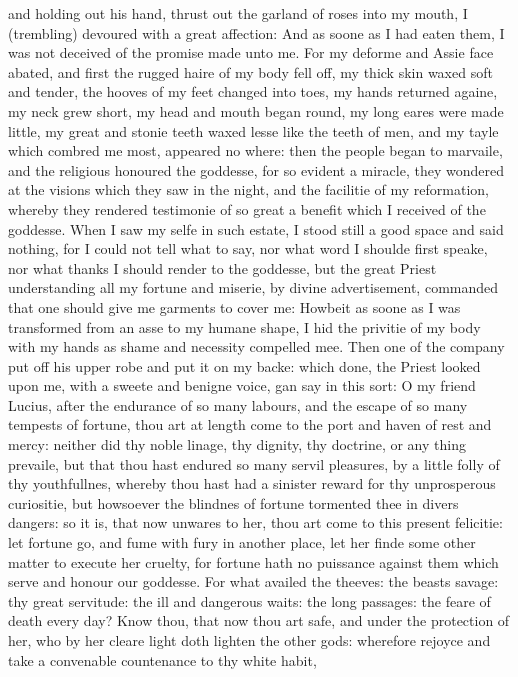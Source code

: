 and holding out his hand, thrust out the garland of roses into my mouth, I
(trembling) devoured with a great affection: And as soone as I had eaten them,
I was not deceived of the promise made unto me. For my deforme and Assie face
abated, and first the rugged haire of my body fell off, my thick skin waxed
soft and tender, the hooves of my feet changed into toes, my hands returned
againe, my neck grew short, my head and mouth began round, my long eares were
made little, my great and stonie teeth waxed lesse like the teeth of men, and
my tayle which combred me most, appeared no where: then the people began to
marvaile, and the religious honoured the goddesse, for so evident a miracle,
they wondered at the visions which they saw in the night, and the facilitie of
my reformation, whereby they rendered testimonie of so great a benefit which I
received of the goddesse. When I saw my selfe in such estate, I stood still a
good space and said nothing, for I could not tell what to say, nor what word I
shoulde first speake, nor what thanks I should render to the goddesse, but the
great Priest understanding all my fortune and miserie, by divine advertisement,
commanded that one should give me garments to cover me: Howbeit as soone as I
was transformed from an asse to my humane shape, I hid the privitie of my body
with my hands as shame and necessity compelled mee. Then one of the company put
off his upper robe and put it on my backe: which done, the Priest looked upon
me, with a sweete and benigne voice, gan say in this sort: O my friend Lucius,
after the endurance of so many labours, and the escape of so many tempests of
fortune, thou art at length come to the port and haven of rest and mercy:
neither did thy noble linage, thy dignity, thy doctrine, or any thing prevaile,
but that thou hast endured so many servil pleasures, by a little folly of thy
youthfullnes, whereby thou hast had a sinister reward for thy unprosperous
curiositie, but howsoever the blindnes of fortune tormented thee in divers
dangers: so it is, that now unwares to her, thou art come to this present
felicitie: let fortune go, and fume with fury in another place, let her finde
some other matter to execute her cruelty, for fortune hath no puissance against
them which serve and honour our goddesse. For what availed the theeves: the
beasts savage: thy great servitude: the ill and dangerous waits: the long
passages: the feare of death every day? Know thou, that now thou art safe, and
under the protection of her, who by her cleare light doth lighten the other
gods: wherefore rejoyce and take a convenable countenance to thy white habit,
